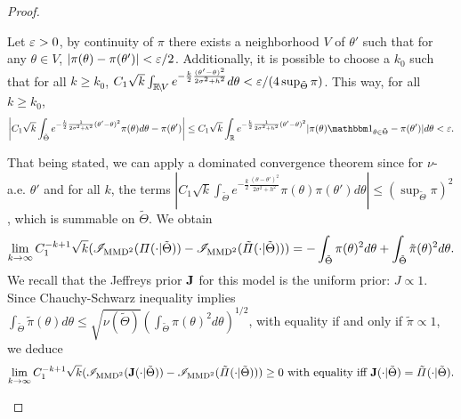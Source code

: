\begin{proof}
\begin{enumerate}
    Let $\varepsilon>0$, by continuity of $\pi$ there exists a neighborhood $V$ of $\theta'$ such that for any $\theta\in V$,  $|\pi(\theta)-\pi(\theta')|<\varepsilon/2$. %
    Additionally, it is possible to choose a $k_0$ such that for all $k\geq k_0$, $C_1\sqrt{k}\int_{\mathbb{R}\!\setminus\!V} e^{-\frac{k}{2}\frac{(\theta'-\theta)^2}{2\sigma^2+h^2}}d\theta <\varepsilon/(4\sup_{\tilde\Theta}\pi)$. This way, for all $k\geq k_0$,
        \begin{equation}
            \left|C_1\sqrt{k}\int_{\tilde\Theta}e^{-\frac{k}{2}\frac{1}{2\sigma^2+h^2}(\theta'-\theta)^2}\pi(\theta)d\theta -\pi(\theta')  \right| \leq C_1\sqrt{k}\int_{\RR}e^{-\frac{k}{2}\frac{1}{2\sigma^2+h^2}(\theta'-\theta)^2} |\pi(\theta)\indic_{\theta\in\tilde\Theta}-\pi(\theta')|d\theta 
            <\eps.
        \end{equation}
    
    That being stated, we can apply a dominated convergence theorem since for $\nu$-a.e. $\theta'$ and for all $k$, the terms $|C_1\sqrt{k}\int_{\tilde\Theta} e^{-\frac{k}{2}\frac{(\theta-\theta')^2}{2\sigma^2+h^2}}\pi(\theta)\pi(\theta')d\theta |\leq(\sup_{\tilde\Theta}\pi)^2$, which is summable on $\tilde\Theta$.
    We obtain
    \begin{equation}
        \lim_{k\rightarrow\infty} C_1^{-k+1}\sqrt{k}(\mathscr{I}_{\text{MMD}^2}(\varPi(\cdot|\tilde\Theta))-\mathscr{I}_{\text{MMD}^2}(\tilde\varPi(\cdot|\tilde\Theta)) ) = -\int_{\tilde\Theta}\pi(\theta)^2d\theta + \int_{\tilde\Theta}\tilde\pi(\theta)^2d\theta.
    \end{equation}
    We recall that the Jeffreys prior $\mathbf{J} $ for this model is the uniform prior: $J\propto 1$.
    Since Chauchy-Schwarz inequality implies $\int_{\tilde\Theta}\tilde\pi(\theta)d\theta \leq \sqrt{\nu(\tilde\Theta)} \left(\int_{\tilde\Theta}\pi(\theta)^2d\theta \right)^{1/2}$, with equality if and only if $\tilde\pi\propto 1$, we deduce 
    \begin{equation}
        \lim_{k\rightarrow\infty} C_1^{-k+1}\sqrt{k}(\mathscr{I}_{\text{MMD}^2}(\mathbf{J}(\cdot|\tilde\Theta))-\mathscr{I}_{\text{MMD}^2}(\tilde\varPi(\cdot|\tilde\Theta)) ) \geq 0 \text{\ with equality iff\ }\mathbf{J}(\cdot|\tilde\Theta) = \tilde\varPi(\cdot|\tilde\Theta).
    \end{equation}


\end{enumerate}
\end{proof}
